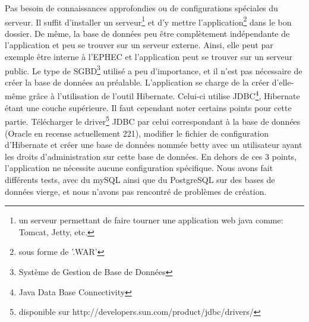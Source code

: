Pas besoin de connaissances approfondies ou de configurations spéciales du
serveur. Il suffit d'installer un serveur\footnote{un serveur permettant
de faire tourner une application web java comme: Tomcat, Jetty, etc.} et d'y
mettre l'application\footnote{sous forme de '.WAR'} dans le bon dossier.
De même, la base de données peu être complètement indépendante de l'application
et peu se trouver sur un serveur externe. Ainsi, elle peut par exemple être interne à l'EPHEC et l'application peut se trouver sur un serveur public.
Le type de SGBD\footnote{Système de Gestion de Base de Données} utilisé a peu d'importance, et il n'est pas nécessaire de créer
la base de données au préalable. L'application se charge de la créer d'elle-même
grâce à l'utilisation de l'outil Hibernate. Celui-ci utilise JDBC\footnote{Java Data Base Connectivity}, Hibernate étant une couche supérieure. Il faut cependant noter certains points pour cette partie. Télécharger le driver\footnote{disponible sur http://developers.sun.com/product/jdbc/drivers/} JDBC par celui correspondant à la base de données (Oracle en recense actuellement 221), modifier le fichier de configuration d'Hibernate et créer une base de données nommée betty avec un utilisateur ayant les droits d'administration sur cette base de données. En dehors de ces 3 points, l'application ne nécessite aucune configuration spécifique. Nous avons fait différents tests, avec du mySQL ainsi que du PostgreSQL sur des bases de données vierge, et nous n'avons pas rencontré de problèmes de création.\\
\newline
\indent

